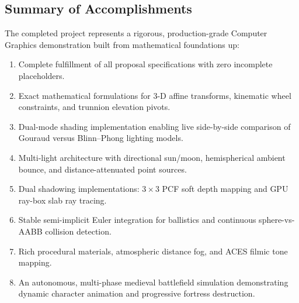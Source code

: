 \documentclass[11pt,a4paper]{article}
\begin{document}
\subsection{Summary of Accomplishments}
The completed project represents a rigorous, production-grade Computer Graphics demonstration built from mathematical foundations up:
\begin{enumerate}[itemsep=1pt,topsep=2pt]
  \item Complete fulfillment of all proposal specifications with zero incomplete placeholders.
  \item Exact mathematical formulations for 3-D affine transforms, kinematic wheel constraints, and trunnion elevation pivots.
  \item Dual-mode shading implementation enabling live side-by-side comparison of Gouraud versus Blinn--Phong lighting models.
  \item Multi-light architecture with directional sun/moon, hemispherical ambient bounce, and distance-attenuated point sources.
  \item Dual shadowing implementations: $3 \times 3$ PCF soft depth mapping and GPU ray-box slab ray tracing.
  \item Stable semi-implicit Euler integration for ballistics and continuous sphere-vs-AABB collision detection.
  \item Rich procedural materials, atmospheric distance fog, and ACES filmic tone mapping.
  \item An autonomous, multi-phase medieval battlefield simulation demonstrating dynamic character animation and progressive fortress destruction.
\end{enumerate}
\end{document}
